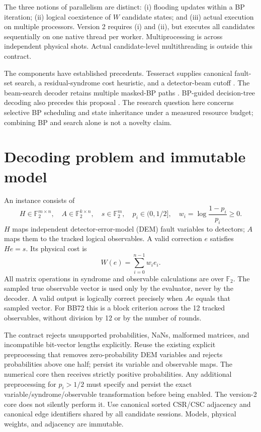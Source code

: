 \documentclass[11pt,a4paper]{article}
\newcommand{\F}{\mathbb F_2}
\begin{document}
The three notions of parallelism are distinct: (i) flooding updates within a BP iteration; (ii) logical coexistence of $W$ candidate states; and (iii) actual execution on multiple processors. Version 2 requires (i) and (ii), but executes all candidates sequentially on one native thread per worker. Multiprocessing is across independent physical shots. Actual candidate-level multithreading is outside this contract.

The components have established precedents. Tesseract supplies canonical fault-set search, a residual-syndrome cost heuristic, and a detector-beam cutoff \cite{tesseract}. The beam-search decoder retains multiple masked-BP paths \cite{beam}. BP-guided decision-tree decoding also precedes this proposal \cite{dtd}. The research question here concerns selective BP scheduling and state inheritance under a measured resource budget; combining BP and search alone is not a novelty claim.

\section{Decoding problem and immutable model}
An instance consists of
\begin{equation}
 H\in\F^{m\times n},\quad A\in\F^{k\times n},\quad
 s\in\F^m,\quad p_i\in(0,1/2],\quad
 w_i=\log\frac{1-p_i}{p_i}\geq0.
\end{equation}
$H$ maps independent detector-error-model (DEM) fault variables to detectors; $A$ maps them to the tracked logical observables. A valid correction $e$ satisfies $He=s$. Its physical cost is
\begin{equation}\label{eq:physical}
 W(e)=\sum_{i=0}^{n-1}w_i e_i.
\end{equation}
All matrix operations in syndrome and observable calculations are over $\F$. The sampled true observable vector is used only by the evaluator, never by the decoder. A valid output is logically correct precisely when $Ae$ equals that sampled vector. For BB72 this is a block criterion across the 12 tracked observables, without division by 12 or by the number of rounds.

The contract rejects unsupported probabilities, NaNs, malformed matrices, and incompatible bit-vector lengths explicitly. Reuse the existing explicit preprocessing that removes zero-probability DEM variables and rejects probabilities above one half; persist its variable and observable maps. The numerical core then receives strictly positive probabilities. Any additional preprocessing for $p_i>1/2$ must specify and persist the exact variable/syndrome/observable transformation before being enabled. The version-2 core does not silently perform it. Use canonical sorted CSR/CSC adjacency and canonical edge identifiers shared by all candidate sessions. Models, physical weights, and adjacency are immutable.
\end{document}
